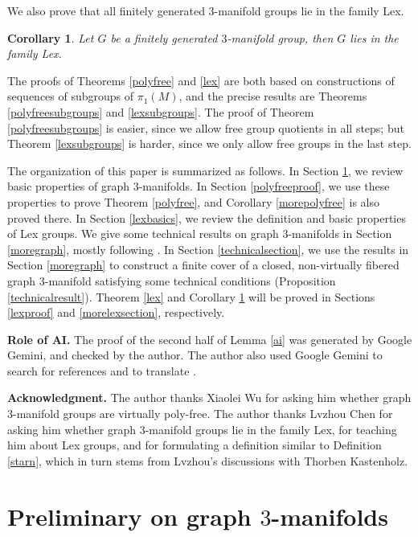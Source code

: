\documentclass{amsart}
\numberwithin{equation}{section}
\newtheorem{corollary}[theorem]{Corollary}
\theoremstyle{definition}
\begin{document}
We also prove that all finitely generated $3$-manifold groups lie in the family Lex.

\begin{corollary}\label{morelex}
Let $G$ be a finitely generated $3$-manifold group, then $G$ lies in the family Lex.
\end{corollary}

The proofs of Theorems \ref{polyfree} and \ref{lex} are both based on constructions of sequences of subgroups of $\pi_1(M)$, and the precise results are Theorems \ref{polyfreesubgroups} and \ref{lexsubgroups}. The proof of Theorem \ref{polyfreesubgroups} is easier, since we allow free group quotients in all steps; but Theorem \ref{lexsubgroups} is harder, since we only allow free groups in the last step.

The organization of this paper is summarized as follows. In Section \ref{preliminarygraph}, we review basic properties of graph $3$-manifolds. In Section \ref{polyfreeproof}, we use these properties to prove Theorem \ref{polyfree}, and Corollary \ref{morepolyfree} is also proved there. In Section \ref{lexbasics}, we review the definition and basic properties of Lex groups. We give some technical results on graph $3$-manifolds in Section \ref{moregraph}, mostly following \cite{WY}. In Section \ref{technicalsection}, we use the results in Section \ref{moregraph} to construct a finite cover of a closed, non-virtually fibered graph $3$-manifold satisfying some technical conditions (Proposition \ref{technicalresult}). Theorem \ref{lex} and Corollary \ref{morelex} will be proved in Sections \ref{lexproof} and \ref{morelexsection}, respectively.

\bigskip

{\bf Role of AI.} The proof of the second half of Lemma \ref{ai} was generated by Google Gemini, and checked by the author. The author also used Google Gemini to search for references and to translate \cite{Bra, Bou}.

{\bf Acknowledgment.} The author thanks Xiaolei Wu for asking him whether graph $3$-manifold groups are virtually poly-free. The author thanks Lvzhou Chen for asking him whether graph $3$-manifold groups lie in the family Lex, for teaching him about Lex groups, and for formulating a definition similar to Definition \ref{starn}, which in turn stems from Lvzhou's discussions with Thorben Kastenholz.



\section{Preliminary on graph $3$-manifolds}\label{preliminarygraph}
\end{document}
